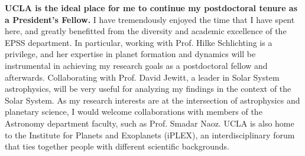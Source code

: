 \documentclass[12pt, letterpaper]{article}
\begin{document}
\vspace{0.2in}

\textbf{UCLA is the ideal place for me to continue my postdoctoral tenure as a President's Fellow.} I have tremendously enjoyed the time that I have spent here, and greatly benefitted from the diversity and academic excellence of the EPSS department. In particular, working with Prof. Hilke Schlichting is a privilege, and her expertise in planet formation and dynamics will be instrumental in achieving my research goals as a postdoctoral fellow and afterwards. Collaborating with Prof. David Jewitt, a leader in Solar System astrophysics, will be very useful for analyzing my findings in the context of the Solar System. As my research interests are at the intersection of astrophysics and planetary science, I would welcome collaborations with members of the Astronomy department faculty, such as Prof. Smadar Naoz. UCLA is also home to the Institute for Planets and Exoplanets (iPLEX), an interdisciplinary forum that ties together people with different scientific backgrounds. %




%
\FloatBarrier
\end{document}
